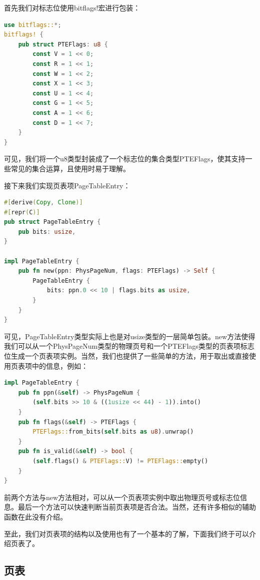 首先我们对标志位使用bitflags!宏进行包装：

\begin{lstlisting}[language={Rust}, label={code:pte},
	caption={os/src/mm/page\_table.rs}]
use bitflags::*;
bitflags! {
	pub struct PTEFlags: u8 {
		const V = 1 << 0;
		const R = 1 << 1;
		const W = 1 << 2;
		const X = 1 << 3;
		const U = 1 << 4;
		const G = 1 << 5;
		const A = 1 << 6;
		const D = 1 << 7;
	}
}
\end{lstlisting}

可见，我们将一个u8类型封装成了一个标志位的集合类型PTEFlags，使其支持一些常见的集合运算，且使用时易于理解。

接下来我们实现页表项PageTableEntry：

\begin{lstlisting}[language={Rust}, label={code:pte},
	caption={os/src/mm/page\_table.rs}]
#[derive(Copy, Clone)]
#[repr(C)]
pub struct PageTableEntry {
	pub bits: usize,
}

impl PageTableEntry {
	pub fn new(ppn: PhysPageNum, flags: PTEFlags) -> Self {
		PageTableEntry {
			bits: ppn.0 << 10 | flags.bits as usize,
		}
	}
}
\end{lstlisting}

可见，PageTableEntry类型实际上也是对usize类型的一层简单包装。new方法使得我们可以从一个PhysPageNum类型的物理页号和一个PTEFlags类型的页表项标志位生成一个页表项实例。当然，我们也提供了一些简单的方法，用于取出或直接使用页表项中的信息，例如：

\begin{lstlisting}[language={Rust}, label={code:pte},
	caption={os/src/mm/page\_table.rs}]
impl PageTableEntry {
	pub fn ppn(&self) -> PhysPageNum {
		(self.bits >> 10 & ((1usize << 44) - 1)).into()
	}
	pub fn flags(&self) -> PTEFlags {
		PTEFlags::from_bits(self.bits as u8).unwrap()
	}
	pub fn is_valid(&self) -> bool {
		(self.flags() & PTEFlags::V) != PTEFlags::empty()
	}
}
\end{lstlisting}

前两个方法与new方法相对，可以从一个页表项实例中取出物理页号或标志位信息。最后一个方法可以快速判断当前页表项是否合法。当然，还有许多相似的辅助函数在此没有介绍。

至此，我们对页表项的结构以及使用也有了一个基本的了解，下面我们终于可以介绍页表了。

\subsection{页表}

